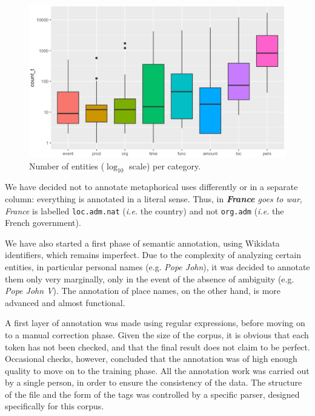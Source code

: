 \begin{figure}[!htp]
    \centering
    \includegraphics[width=0.75\linewidth]{static/media/mod_eval/dalembert/corpus_desc_1.png}
    \caption{Number of entities (\textit{$\log_{10}$} scale) per category.}
    \label{fig:repartition}
\end{figure}

We have decided not to annotate metaphorical uses differently or in a separate column: everything is annotated in a literal sense. Thus, in \textit{\textbf{France} goes to war}, \textit{France} is labelled \texttt{loc.adm.nat} (\textit{i.e.} the country) and not \texttt{org.adm} (\textit{i.e.} the French government).

We have also started a first phase of semantic annotation, using Wikidata~\cite{vrandecic-krotzsch-2014-wikidata} identifiers, which remains imperfect. Due to the complexity of analyzing certain entities, in particular personal names (e.g. \textit{Pope John}), it was decided to annotate them only very marginally, only in the event of the absence of ambiguity (e.g. \textit{Pope John V}). The annotation of place names, on the other hand, is more advanced and almost functional.

A first layer of annotation was made using regular expressions, before moving on to a manual correction phase. Given the size of the corpus, it is obvious that each token has not been checked, and that the final result does not claim to be perfect. Occasional checks, however, concluded that the annotation was of high enough quality to move on to the training phase. All the annotation work was carried out by a single person, in order to ensure the consistency of the data. The structure of the file and the form of the tags was controlled by a specific parser, designed specifically for this corpus.
